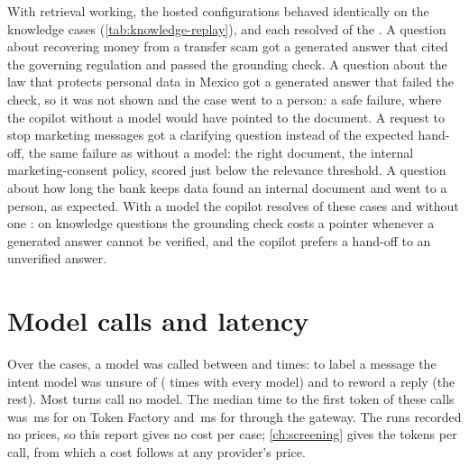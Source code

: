 
With retrieval working, the  hosted configurations behaved identically on the knowledge cases
(\cref{tab:knowledge-replay}), and each resolved  of the
. A question about recovering money from a transfer scam got a generated answer that
cited the governing regulation and passed the grounding check. A question about the law that protects personal data
in Mexico got a generated answer that failed the check, so it was not shown and the case went to a person: a safe
failure, where the copilot without a model would have pointed to the document. A request to stop marketing messages
got a clarifying question instead of the expected hand-off, the same failure as without a model: the right document,
the internal marketing-consent policy, scored just below the relevance threshold. A question about how long the bank keeps data found an internal document and went to a person, as
expected. With a model the copilot resolves  of these cases and without one
: on knowledge questions the grounding check costs a pointer whenever a
generated answer cannot be verified, and the copilot prefers a hand-off to an unverified answer.

\section{Model calls and latency}

Over the  cases, a model was called between  and
 times: to label a message the intent model was unsure of
( times with every model) and to reword a reply (the rest). Most turns call no model.
The median time to the first token of these calls was \,ms for
 on Token Factory and \,ms for  through
the gateway. The runs recorded no prices, so this report gives no cost per case; \cref{ch:screening} gives the tokens
per call, from which a cost follows at any provider's price.
